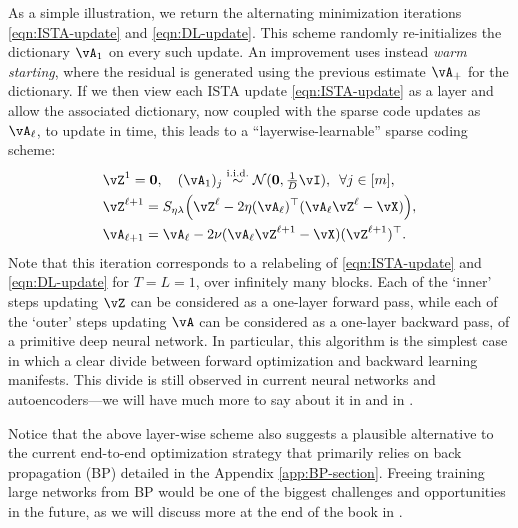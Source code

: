 \documentclass[../../book-main.tex]{subfiles}
\begin{document}
As a simple illustration, we return the alternating minimization iterations
\eqref{eqn:ISTA-update} and \eqref{eqn:DL-update}.
This scheme randomly re-initializes the dictionary $\vA_1$ on every such update.
An improvement uses instead \textit{warm starting}, where the residual is
generated using the previous estimate $\vA_+$ for the dictionary.
If we then view each ISTA update \eqref{eqn:ISTA-update} as a layer and allow
the associated dictionary, now coupled with the sparse code updates as
$\vA_\ell$, to update in time, this leads to a  ``layerwise-learnable'' sparse
coding scheme:
\begin{align}
    & \vZ^{1}
     = \Zero, \quad (\vA_{1})_j
     \simiid \dNorm(\vzero, \tfrac{1}{D}\vI), \enspace \forall j \in [m], \\ 
    & \vZ^{\ell + 1} = S_{\eta\lambda}\rp{\vZ^{\ell}
    - 2\eta(\vA_{\ell})^\top(\vA_{\ell}\vZ^{\ell}
    - \vX)},\label{eq:ISTA-update-layerwise}\\ 
    & \vA_{\ell + 1} = \vA_{\ell}- 2\nu (\vA_{\ell}\vZ^{\ell + 1}
    - \vX)(\vZ^{\ell + 1})^\top.
\end{align}
Note that this iteration %
corresponds to a relabeling of \eqref{eqn:ISTA-update} and \eqref{eqn:DL-update}
for $T = L = 1$, over infinitely many blocks.
Each of the `inner' steps updating $\vZ$ can be considered as a one-layer
forward pass, while each of the `outer' steps updating $\vA$ can be considered
as a one-layer  backward pass, of a primitive deep neural network. In
particular, this algorithm is the simplest case in which a clear divide between
forward optimization and backward learning manifests. This divide is still
observed in current neural networks and autoencoders---we will have much more to say about it in  and in
. 

Notice that the above layer-wise scheme also suggests a plausible alternative to the current end-to-end optimization strategy that primarily relies on back propagation (BP) detailed in the Appendix \ref{app:BP-section}. Freeing training large networks from BP would be one of the biggest challenges and opportunities in the future, as we will discuss more at the end of the book in .
\end{document}
